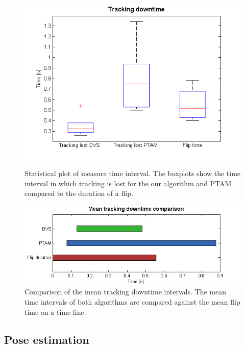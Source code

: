\begin{figure}[h]
     \centering
     \includegraphics[width=1.0\textwidth]{img/flip_times.png}
     \caption{Statistical plot of measure time interval. The boxplots show the time interval in which tracking is lost for the our algorithm and PTAM compared to the duration of a flip.}
     \label{img:fliptimes}
\end{figure}

\begin{figure}[h]
     \centering
     \includegraphics[width=1.0\textwidth]{img/mean_downtime.png}
     \caption{Comparison of the mean tracking downtime intervals. The mean time intervals of both algorithms are compared against the mean flip time on a time line.}
     \label{img:mean_downtime}
\end{figure}

\subsection{Pose estimation}\label{sec:poseestimationeval}

